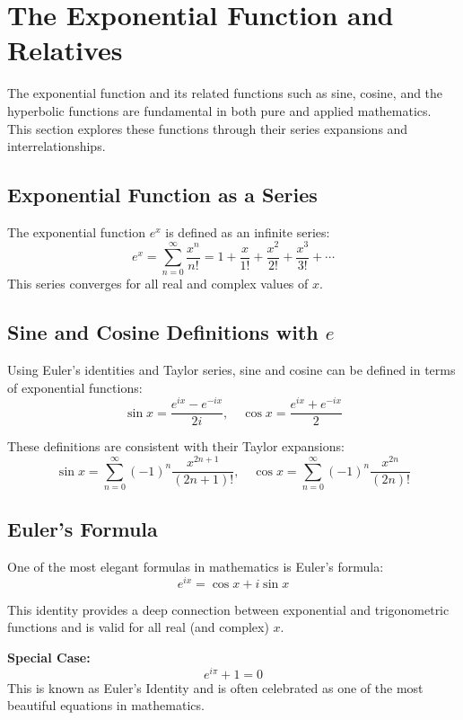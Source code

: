 

\section{The Exponential Function and Relatives}

The exponential function and its related functions such as sine, cosine, and the hyperbolic functions are fundamental in both pure and applied mathematics. This section explores these functions through their series expansions and interrelationships.

\subsection{Exponential Function as a Series}

The exponential function \(e^x\) is defined as an infinite series:
\[
e^x = \sum_{n=0}^{\infty} \frac{x^n}{n!}
= 1 + \frac{x}{1!} + \frac{x^2}{2!} + \frac{x^3}{3!} + \cdots
\]
This series converges for all real and complex values of \(x\).

\subsection{Sine and Cosine Definitions with \texorpdfstring{\(e\)}{e}}

Using Euler's identities and Taylor series, sine and cosine can be defined in terms of exponential functions:
\[
\sin x = \frac{e^{ix} - e^{-ix}}{2i}, \quad
\cos x = \frac{e^{ix} + e^{-ix}}{2}
\]

These definitions are consistent with their Taylor expansions:
\[
\sin x = \sum_{n=0}^{\infty} (-1)^n \frac{x^{2n+1}}{(2n+1)!}, \quad
\cos x = \sum_{n=0}^{\infty} (-1)^n \frac{x^{2n}}{(2n)!}
\]

\subsection{Euler's Formula}

One of the most elegant formulas in mathematics is Euler’s formula:
\[
e^{ix} = \cos x + i\sin x
\]

This identity provides a deep connection between exponential and trigonometric functions and is valid for all real (and complex) \(x\).

\textbf{Special Case:}
\[
e^{i\pi} + 1 = 0
\]
This is known as Euler's Identity and is often celebrated as one of the most beautiful equations in mathematics.

